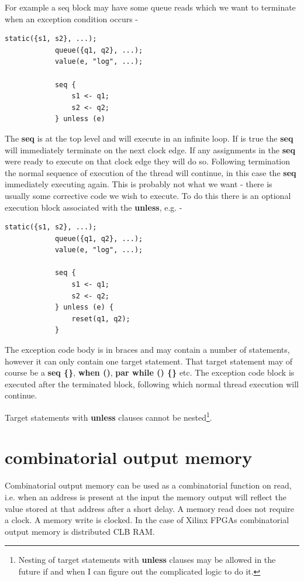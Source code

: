         For example a seq block may have some queue reads which we want to terminate
        when an exception condition occurs -
        \begin{lstlisting}[language=threepl]
            static({s1, s2}, ...);
            queue({q1, q2}, ...);
            value(e, "log", ...);

            seq {
                s1 <- q1;
                s2 <- q2;
            } unless (e)
        \end{lstlisting}
        The {\bf seq} is at the top level and will execute in an infinite loop. If
         is true the {\bf seq} will immediately terminate on the next clock
        edge. If any assignments in the {\bf seq} were ready to execute on that clock
        edge they will do so. Following termination the normal sequence of execution of
        the thread will continue, in this case the {\bf seq} immediately executing
        again. This is probably not what we want - there is usually some corrective
        code we wish to execute. To do this  there is an optional execution block
        associated with the {\bf unless}, e.g. -
        \begin{lstlisting}[language=threepl]
            static({s1, s2}, ...);
            queue({q1, q2}, ...);
            value(e, "log", ...);

            seq {
                s1 <- q1;
                s2 <- q2;
            } unless (e) {
                reset(q1, q2);
            }
        \end{lstlisting}
        The exception code body is in braces and may contain a number of statements,
        however it can only contain one target statement. That target statement
        may of course be a {\bf seq \{\}}, {\bf when ()},  {\bf par while () \{\}} etc.
        The exception code block is executed after the terminated block, following
        which normal thread execution will continue.

        Target statements with {\bf unless} clauses cannot be nested\footnote{Nesting
        of target statements with {\bf unless} clauses may be allowed in the future
        if and when I can figure out the complicated logic to do it.}.


    \section{combinatorial output memory}

        Combinatorial output memory can be used as a combinatorial function on read,
        i.e. when an address is present at the input the memory output will reflect
        the value stored at that address after a short delay. A memory read does not
        require a clock. A memory write is clocked. In the case of Xilinx FPGAs
        combinatorial output memory is distributed CLB RAM.

